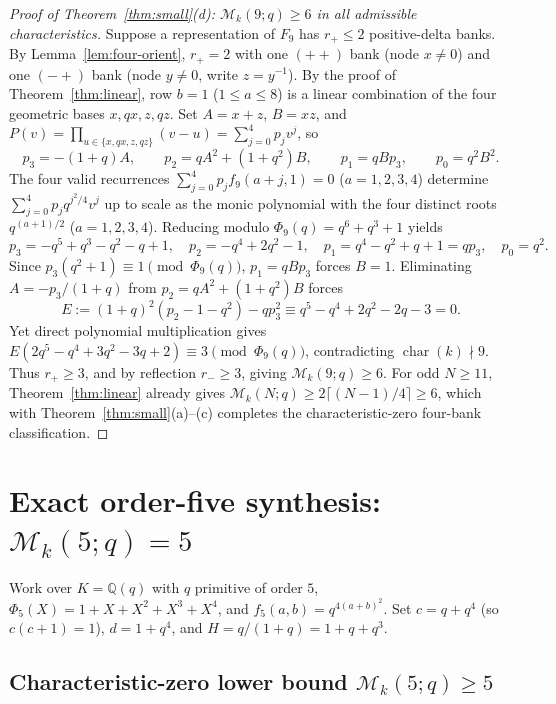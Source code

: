 \documentclass[11pt,reqno]{amsart}
\numberwithin{equation}{section}
\theoremstyle{definition}
\theoremstyle{remark}
\newcommand{\Q}{\mathbb{Q}}
\newcommand{\M}{\mathcal{M}}
\begin{document}
\begin{proof}[Proof of Theorem~\ref{thm:small}(d): $\M_k(9;q)\ge 6$ in all admissible characteristics]
Suppose a representation of $F_9$ has $r_+\le 2$ positive-delta banks. By Lemma~\ref{lem:four-orient}, $r_+=2$ with one $(++)$ bank (node $x\ne 0$) and one $(-+)$ bank (node $y\ne 0$, write $z=y^{-1}$). By the proof of Theorem~\ref{thm:linear}, row $b=1$ ($1\le a\le 8$) is a linear combination of the four geometric bases $x,qx,z,qz$. Set $A=x+z$, $B=xz$, and $P(v)=\prod_{u\in\{x,qx,z,qz\}}(v-u)=\sum_{j=0}^4 p_j v^j$, so
\[
p_3 = -(1+q)A,\qquad p_2 = qA^2 + (1+q^2)B,\qquad p_1 = qB p_3,\qquad p_0 = q^2 B^2.
\]
The four valid recurrences $\sum_{j=0}^4 p_j f_9(a+j,1)=0$ ($a=1,2,3,4$) determine $\sum_{j=0}^4 p_j q^{j^2/4}v^j$ up to scale as the monic polynomial with the four distinct roots $q^{(a+1)/2}$ ($a=1,2,3,4$). Reducing modulo $\Phi_9(q)=q^6+q^3+1$ yields
\[
p_3 = -q^5+q^3-q^2-q+1,\quad p_2 = -q^4+2q^2-1,\quad p_1 = q^4-q^2+q+1 = qp_3,\quad p_0 = q^2.
\]
Since $p_3(q^2+1)\equiv 1\pmod{\Phi_9(q)}$, $p_1=qBp_3$ forces $B=1$. Eliminating $A=-p_3/(1+q)$ from $p_2=qA^2+(1+q^2)B$ forces
\[
E := (1+q)^2(p_2 - 1 - q^2) - qp_3^2 \equiv q^5 - q^4 + 2q^2 - 2q - 3 = 0.
\]
Yet direct polynomial multiplication gives $E(2q^5-q^4+3q^2-3q+2)\equiv 3\pmod{\Phi_9(q)}$, contradicting $\operatorname{char}(k)\nmid 9$. Thus $r_+\ge 3$, and by reflection $r_-\ge 3$, giving $\M_k(9;q)\ge 6$. For odd $N\ge 11$, Theorem~\ref{thm:linear} already gives $\M_k(N;q)\ge 2\lceil(N-1)/4\rceil\ge 6$, which with Theorem~\ref{thm:small}(a)--(c) completes the characteristic-zero four-bank classification.
\end{proof}

\section{Exact order-five synthesis: $\M_k(5;q)=5$}
\label{sec:n5}

Work over $K=\Q(q)$ with $q$ primitive of order $5$, $\Phi_5(X)=1+X+X^2+X^3+X^4$, and $f_5(a,b)=q^{4(a+b)^2}$. Set $c=q+q^4$ (so $c(c+1)=1$), $d=1+q^4$, and $H=q/(1+q)=1+q+q^3$.

\subsection{Characteristic-zero lower bound $\M_k(5;q)\ge 5$}
\end{document}
